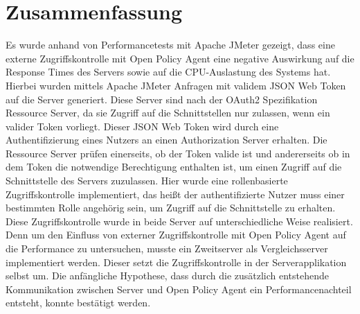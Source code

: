 \chapter{Zusammenfassung}
Es wurde anhand von Performancetests mit Apache JMeter gezeigt, dass eine externe Zugriffskontrolle mit Open Policy Agent eine negative Auswirkung auf die Response Times des Servers sowie auf die CPU-Auslastung des Systems hat. Hierbei wurden mittels Apache JMeter Anfragen mit validem JSON Web Token auf die Server generiert. Diese Server sind nach der OAuth2 Spezifikation Ressource Server, da sie Zugriff auf die Schnittstellen nur zulassen, wenn ein valider Token vorliegt. Dieser JSON Web Token wird durch eine Authentifizierung eines Nutzers an einen Authorization Server erhalten. Die Ressource Server prüfen einerseits, ob der Token valide ist und andererseits ob in dem Token die notwendige Berechtigung enthalten ist, um einen Zugriff auf die Schnittstelle des Servers zuzulassen. Hier wurde eine rollenbasierte Zugriffskontrolle implementiert, das heißt der authentifizierte Nutzer muss einer bestimmten Rolle angehörig sein, um Zugriff auf die Schnittstelle zu erhalten. Diese Zugriffskontrolle wurde in beide Server auf unterschiedliche Weise realisiert. Denn um den Einfluss von externer Zugriffskontrolle mit Open Policy Agent auf die Performance zu untersuchen, musste ein Zweitserver als Vergleichsserver implementiert werden. Dieser setzt die Zugriffskontrolle in der Serverapplikation selbst um. Die anfängliche Hypothese, dass durch die zusätzlich entstehende Kommunikation zwischen Server und Open Policy Agent ein Performancenachteil entsteht, konnte bestätigt werden.\bigskip

